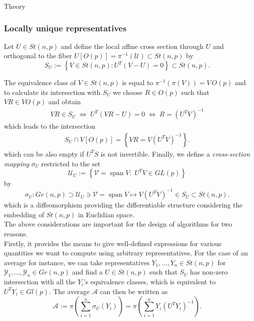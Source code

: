 \begin{chapter}{Theory}
\subsubsection{Locally unique representatives} %
\label{ssub:Locally unique Representative}
Let $U\in St(n,p)$ and define the local affine cross section through $U$ and orthogonal to the fiber $U[O(p)]=\pi^{-1}(\mathcal{U})\subset St(n,p)$ by
\begin{equation}
    S_U := \left\lbrace V\in St(n,p): U^T(V-U)=0 \right\rbrace\subset St(n,p).
\end{equation}

The equivalence class of $V\in St(n,p)$ is equal to $\pi^{-1}(\pi(V))=V\,O(p)$ and to calculate its intersection with $S_U$ we choose $R\in O(p)$ such that
$VR\in VO(p)$ and obtain
\begin{align}
    VR\in S_U\;\Leftrightarrow\; U^T(VR-U)=0 \;\Leftrightarrow\; R = (U^TV)^{-1}
\end{align}
which leads to the intersection
\begin{align}
    S_U \cap V[O(p)] = \left\lbrace VR = V(U^{T}V)^{-1} \right\rbrace .
\end{align}
which can be also empty if $U^{T}S$ is not invertible. Finally, we define a \emph{cross-section mapping} $\sigma_U$ restricted to the set
\begin{equation}
    \mathcal{U}_U := \left\lbrace\mathcal{V}=\operatorname{span}V:\; U^TV\in GL(p) \right\rbrace
\end{equation}
by 
\begin{equation}
    \sigma_U: Gr(n,p)\supset \mathcal{U}_U\ni\mathcal{V}=\operatorname{span}V\mapsto V(U^{T}V)^{-1} \in S_U \subset St(n,p).
\end{equation}
which is a diffeomorphism providing the differentiable structure considering the embedding of $St(n,p)$ in Euclidian space.\\

The above considerations are important for the design of algorithms for two reasons.\\
Firstly, it provides the means to give well-defined expressions for various quantities we want to compute using arbitrary representatives.
For the case of an average for instance, we can take representatives $Y_1,\ldots,Y_n\in St(n,p)$ for $\mathcal{Y}_1,\ldots,\mathcal{Y}_n\in Gr(n,p)$
and find a $U\in St(n,p)$ such that $S_U$ has non-zero intersection with all the $Y_i$'s equivalence classes, which is equivalent
to $U^TY_i\in Gl(p)$. The average $\mathcal{A}$ can then be written as
\begin{equation}
    \mathcal{A} := \pi\left(\sum_{i=1}^{n}\sigma_U(Y_i)\right)=\pi\left(\sum_{i=1}^{n}Y_i(U^{T}Y_i)^{-1}\right).
\end{equation}


\end{chapter}
